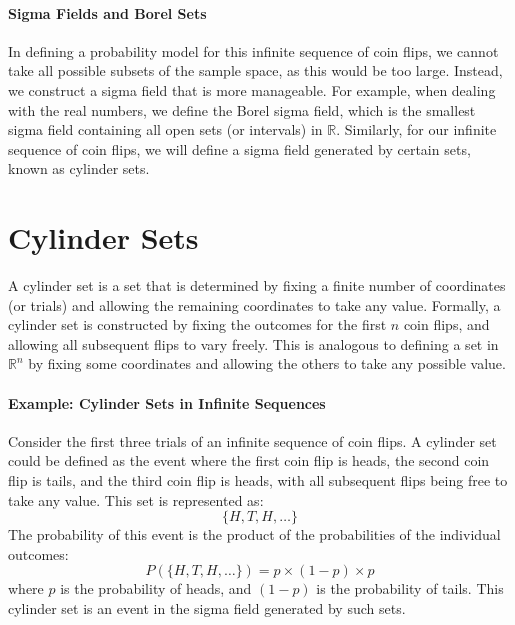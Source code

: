     \paragraph{Sigma Fields and Borel Sets}
    In defining a probability model for this infinite sequence of coin flips, we cannot take all possible subsets of the sample space, as this would be too large. Instead, we construct a sigma field that is more manageable. \newline
    For example, when dealing with the real numbers, we define the Borel sigma field, which is the smallest sigma field containing all open sets (or intervals) in $\mathbb{R}$. Similarly, for our infinite sequence of coin flips, we will define a sigma field generated by certain sets, known as cylinder sets.
    
    \section{Cylinder Sets}
    A cylinder set is a set that is determined by fixing a finite number of coordinates (or trials) and allowing the remaining coordinates to take any value. Formally, a cylinder set is constructed by fixing the outcomes for the first $n$ coin flips, and allowing all subsequent flips to vary freely. This is analogous to defining a set in $\mathbb{R}^n$ by fixing some coordinates and allowing the others to take any possible value.
    
    \paragraph{Example: Cylinder Sets in Infinite Sequences}
    Consider the first three trials of an infinite sequence of coin flips. A cylinder set could be defined as the event where the first coin flip is heads, the second coin flip is tails, and the third coin flip is heads, with all subsequent flips being free to take any value. This set is represented as:
    \[
    \{H, T, H, \dots\}
    \]
    The probability of this event is the product of the probabilities of the individual outcomes:
    \[
    P(\{H, T, H, \dots\}) = p \times (1 - p) \times p
    \]
    where $p$ is the probability of heads, and $(1 - p)$ is the probability of tails. This cylinder set is an event in the sigma field generated by such sets.
    
